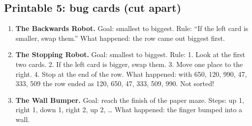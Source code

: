 \subsection*{Printable 5: bug cards (cut apart)}
\begin{enumerate}[leftmargin=1.6em,itemsep=4pt]
  \item \textbf{The Backwards Robot.} Goal: smallest to biggest. Rule: \enquote{If the left card is smaller, swap them.} What happened: the row came out biggest first.
  \item \textbf{The Stopping Robot.} Goal: smallest to biggest. Rule: 1. Look at the first two cards. 2. If the left card is bigger, swap them. 3. Move one place to the right. 4. Stop at the end of the row. What happened: with 650, 120, 990, 47, 333, 509 the row ended as 120, 650, 47, 333, 509, 990. Not sorted!
  \item \textbf{The Wall Bumper.} Goal: reach the finish of the paper maze. Steps: up 1, right 1, down 1, right 2, up 2, \ldots{} What happened: the finger bumped into a wall.
\end{enumerate}
